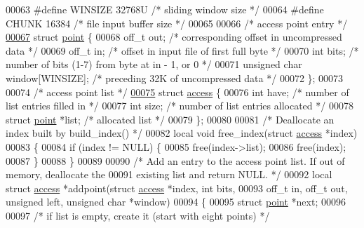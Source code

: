 \begin{DoxyCode}
00063 \textcolor{preprocessor}{#define WINSIZE 32768U      }\textcolor{comment}{/* sliding window size */}\textcolor{preprocessor}{}
00064 \textcolor{preprocessor}{#define CHUNK 16384         }\textcolor{comment}{/* file input buffer size */}\textcolor{preprocessor}{}
00065 
00066 \textcolor{comment}{/* access point entry */}
\hyperlink{structpoint}{00067} \textcolor{keyword}{struct }\hyperlink{structpoint}{point} \{
00068     off\_t out;          \textcolor{comment}{/* corresponding offset in uncompressed data */}
00069     off\_t in;           \textcolor{comment}{/* offset in input file of first full byte */}
00070     \textcolor{keywordtype}{int} bits;           \textcolor{comment}{/* number of bits (1-7) from byte at in - 1, or 0 */}
00071     \textcolor{keywordtype}{unsigned} \textcolor{keywordtype}{char} window[WINSIZE];  \textcolor{comment}{/* preceding 32K of uncompressed data */}
00072 \};
00073 
00074 \textcolor{comment}{/* access point list */}
\hyperlink{structaccess}{00075} \textcolor{keyword}{struct }\hyperlink{structaccess}{access} \{
00076     \textcolor{keywordtype}{int} have;           \textcolor{comment}{/* number of list entries filled in */}
00077     \textcolor{keywordtype}{int} size;           \textcolor{comment}{/* number of list entries allocated */}
00078     \textcolor{keyword}{struct }\hyperlink{structpoint}{point} *list; \textcolor{comment}{/* allocated list */}
00079 \};
00080 
00081 \textcolor{comment}{/* Deallocate an index built by build\_index() */}
00082 local \textcolor{keywordtype}{void} free\_index(\textcolor{keyword}{struct} \hyperlink{structaccess}{access} *index)
00083 \{
00084     \textcolor{keywordflow}{if} (index != NULL) \{
00085         free(index->list);
00086         free(index);
00087     \}
00088 \}
00089 
00090 \textcolor{comment}{/* Add an entry to the access point list.  If out of memory, deallocate the}
00091 \textcolor{comment}{   existing list and return NULL. */}
00092 local \textcolor{keyword}{struct }\hyperlink{structaccess}{access} *addpoint(\textcolor{keyword}{struct} \hyperlink{structaccess}{access} *index, \textcolor{keywordtype}{int} bits,
00093     off\_t in, off\_t out, \textcolor{keywordtype}{unsigned} left, \textcolor{keywordtype}{unsigned} \textcolor{keywordtype}{char} *window)
00094 \{
00095     \textcolor{keyword}{struct }\hyperlink{structpoint}{point} *next;
00096 
00097     \textcolor{comment}{/* if list is empty, create it (start with eight points) */}

\end{DoxyCode}
